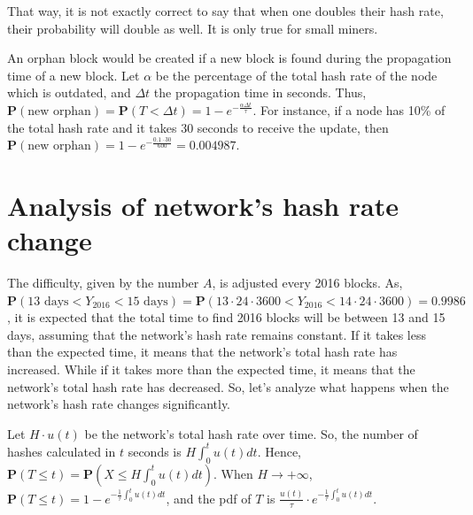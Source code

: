 That way, it is not exactly correct to say that when one doubles their hash rate, their probability will double as well. It is only true for small miners.


An orphan block would be created if a new block is found during the propagation time of a new block. Let $\alpha$ be the percentage of the total hash rate of the node which is outdated, and $\Delta t$ the propagation time in seconds. Thus, $\mathbf{P}(\text{new orphan}) = \mathbf{P}(T < \Delta t) = 1 - e^{-\frac{\alpha \Delta t}{\tau}}$. For instance, if a node has 10\% of the total hash rate and it takes 30 seconds to receive the update, then $\mathbf{P}(\text{new orphan}) = 1 - e^{-\frac{0.1 \cdot 30}{600}} = 0.004987$.

\section{Analysis of network's hash rate change}

The difficulty, given by the number $A$, is adjusted every 2016 blocks. As, $\mathbf{P}(13 \text{ days} < Y_{2016} < 15 \text{ days}) = \mathbf{P}(13 \cdot 24 \cdot 3600 < Y_{2016} < 14 \cdot 24 \cdot 3600) = 0.9986$, it is expected that the total time to find 2016 blocks will be between 13 and 15 days, assuming that the network's hash rate remains constant. If it takes less than the expected time, it means that the network's total hash rate has increased. While if it takes more than the expected time, it means that the network's total hash rate has decreased. So, let's analyze what happens when the network's hash rate changes significantly.


Let $H \cdot u(t)$ be the network's total hash rate over time. So, the number of hashes calculated in $t$ seconds is $H \int_0^t u(t) dt$. Hence, $\mathbf{P}(T \leq t) = \mathbf{P}(X \leq H \int_0^t u(t)dt)$. When $H \rightarrow +\infty$, $\mathbf{P}(T \leq t) = 1 - e^{-\frac{1}{\tau} \int_0^t u(t) dt}$, and the pdf of $T$ is $\frac{u(t)}{\tau} \cdot e^{-\frac{1}{\tau} \int_0^t u(t)dt}$.

